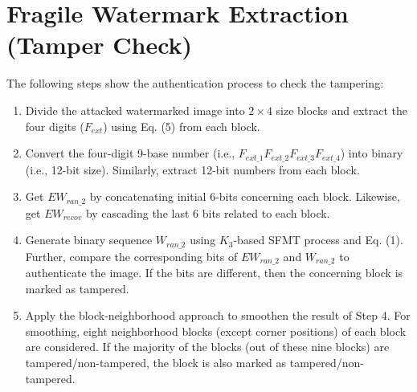 \documentclass{article}
\begin{document}
\section{Fragile Watermark Extraction (Tamper Check)}

The following steps show the authentication process to check the tampering:

\begin{enumerate}
    \item Divide the attacked watermarked image into $2 \times 4$ size blocks and extract the four digits ($F_{ext}$) using Eq. (5) from each block.
    
    \item Convert the four-digit 9-base number (i.e., $F_{ext\_1}F_{ext\_2}F_{ext\_3}F_{ext\_4}$) into binary (i.e., 12-bit size). Similarly, extract 12-bit numbers from each block.
    
    \item Get $EW_{ran\_2}$ by concatenating initial 6-bits concerning each block. Likewise, get $EW_{recov}$ by cascading the last 6 bits related to each block.
    
    \item Generate binary sequence $W_{ran\_2}$ using $K_3$-based SFMT process and Eq. (1). Further, compare the corresponding bits of $EW_{ran\_2}$ and $W_{ran\_2}$ to authenticate the image. If the bits are different, then the concerning block is marked as tampered.
    
    \item Apply the block-neighborhood approach to smoothen the result of Step 4. For smoothing, eight neighborhood blocks (except corner positions) of each block are considered. If the majority of the blocks (out of these nine blocks) are tampered/non-tampered, the block is also marked as tampered/non-tampered.
\end{enumerate}
\end{document}

